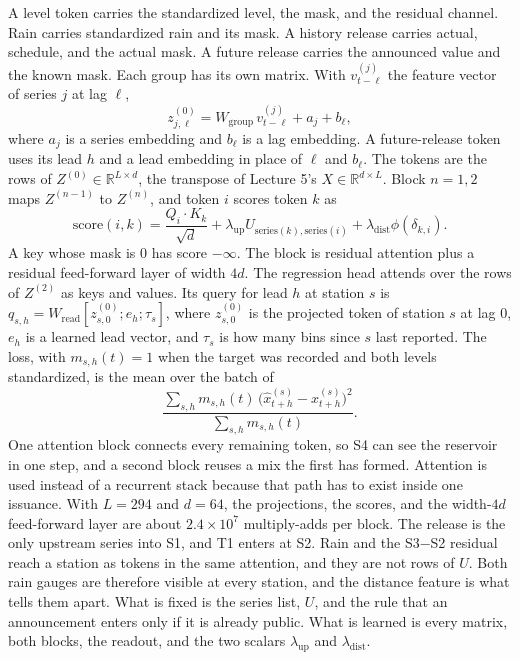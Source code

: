 \documentclass[11pt,a4paper]{article}
\begin{document}
A level token carries the standardized level, the mask, and the residual channel. Rain carries standardized rain and its mask. A history release carries actual, schedule, and the actual mask. A future release carries the announced value and the known mask. Each group has its own matrix. With \(v^{(j)}_{t-\ell}\) the feature vector of series \(j\) at lag \(\ell\),
\[
z^{(0)}_{j,\ell} = W_{\mathrm{group}}\, v^{(j)}_{t-\ell} + a_j + b_{\ell},
\]
where \(a_j\) is a series embedding and \(b_\ell\) is a lag embedding. A future-release token uses its lead \(h\) and a lead embedding in place of \(\ell\) and \(b_\ell\). The tokens are the rows of \(Z^{(0)}\in\mathbb{R}^{L\times d}\), the transpose of Lecture 5's \(X\in\mathbb{R}^{d\times L}\). Block \(n=1,2\) maps \(Z^{(n-1)}\) to \(Z^{(n)}\), and token \(i\) scores token \(k\) as
\[
\mathrm{score}(i,k) = \frac{Q_i\cdot K_k}{\sqrt{d}} + \lambda_{\mathrm{up}} U_{\mathrm{series}(k),\mathrm{series}(i)} + \lambda_{\mathrm{dist}}\phi(\delta_{k,i}).
\]
A key whose mask is 0 has score \(-\infty\). The block is residual attention plus a residual feed-forward layer of width \(4d\). The regression head attends over the rows of \(Z^{(2)}\) as keys and values. Its query for lead \(h\) at station \(s\) is \(q_{s,h} = W_{\mathrm{read}}[z^{(0)}_{s,0}; e_h; \tau_s]\), where \(z^{(0)}_{s,0}\) is the projected token of station \(s\) at lag 0, \(e_h\) is a learned lead vector, and \(\tau_s\) is how many bins since \(s\) last reported. The loss, with \(m_{s,h}(t)=1\) when the target was recorded and both levels standardized, is the mean over the batch of
\[
\frac{\sum_{s,h} m_{s,h}(t)\,\bigl(\hat x^{(s)}_{t+h}-x^{(s)}_{t+h}\bigr)^{2}}{\sum_{s,h} m_{s,h}(t)}.
\]
One attention block connects every remaining token, so S4 can see the reservoir in one step, and a second block reuses a mix the first has formed. Attention is used instead of a recurrent stack because that path has to exist inside one issuance. With \(L=294\) and \(d=64\), the projections, the scores, and the width-\(4d\) feed-forward layer are about \(2.4\times 10^{7}\) multiply-adds per block. The release is the only upstream series into S1, and T1 enters at S2. Rain and the S3$-$S2 residual reach a station as tokens in the same attention, and they are not rows of \(U\). Both rain gauges are therefore visible at every station, and the distance feature is what tells them apart. What is fixed is the series list, \(U\), and the rule that an announcement enters only if it is already public. What is learned is every matrix, both blocks, the readout, and the two scalars \(\lambda_{\mathrm{up}}\) and \(\lambda_{\mathrm{dist}}\).
\end{document}
